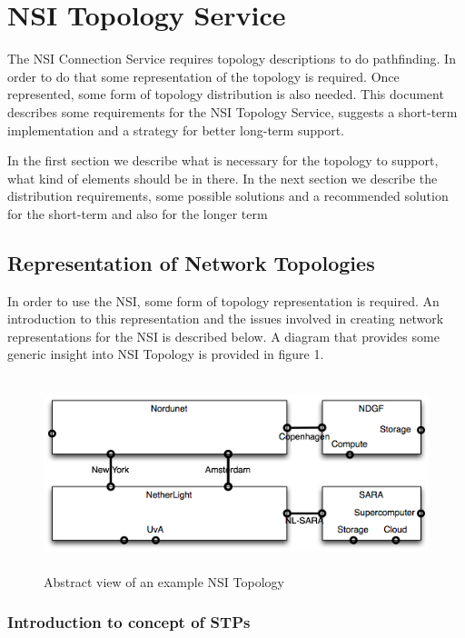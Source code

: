 \documentclass{article}
\begin{document}
\section{NSI Topology Service}

 The NSI Connection Service requires topology descriptions to do 
pathfinding. In order to do that some representation of the topology is required. 
Once represented, some form of topology distribution is also needed. This document 
describes some requirements for the NSI Topology Service, suggests a short-term 
implementation and a strategy for better long-term support.

 In the first section we describe what is necessary for the topology 
to support, what kind of elements should be in there. In the next section we describe 
the distribution requirements, some possible solutions and a recommended solution 
for the short-term and also for the longer term\label{h.15n4tpv97j8w}


\subsection{Representation of Network Topologies}

 In order to use the NSI, some form of topology representation 
is required. An introduction to this representation and the issues involved in 
creating network representations for the NSI is described below. A diagram that 
provides some generic insight into NSI Topology is provided in figure 1.

\begin{figure}[htbp]
\begin{center}
\includegraphics[width=390pt, height=159pt]{NSITopologyService-fig001.png}
\caption{Abstract view of an example NSI Topology}
\end{center}
\end{figure}


\subsubsection{Introduction to concept of STPs}
\end{document}
